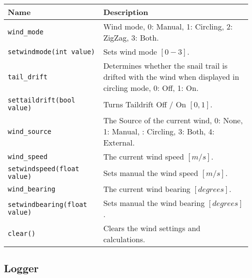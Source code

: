 \begin{maxipage}
\begin{tabularx}{1.9\textwidth}{l|X}
Name & Description \\
\hline\hline

\verb|wind_mode| & Wind mode, 0: Manual, 1: Circling, 2: ZigZag, 3: Both.\\

\hline

\verb|setwindmode(int value)| & Sets wind mode $[0-3]$.\\

\hline

\verb|tail_drift| & Determines whether the snail trail is drifted with the 
wind \newline when displayed in circling mode, 0: Off, 1: On. \\

\hline

\verb|settaildrift(bool value)| & Turns Taildrift Off / On $[{0,1}]$.\\

\hline

\verb|wind_source| & The Source of the current wind, 0: None, 1: Manual,
\newline 2: Circling, 3: Both, 4: External.\\

\hline

\verb|wind_speed| & The current wind speed 
$[{m/s}]$.\\

\hline

\verb|setwindspeed(float value)| & Sets manual the wind speed $[{m/s}]$.\\

\hline

\verb|wind_bearing| & The current wind bearing 
$[{degrees}]$.\\

\hline

\verb|setwindbearing(float value)| & Sets manual the wind bearing $[{degrees}]$.\\

\hline

\verb|clear()| & Clears the wind settings and calculations.\\

\hline

\end{tabularx}
\end{maxipage}

\subsection{Logger}

